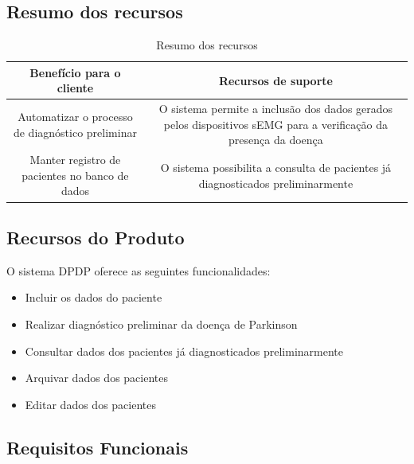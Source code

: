 \begin{anexosenv}
\subsection{Resumo dos recursos}

    \begin{table}[]
        \centering
        \caption{Resumo dos recursos}
        \begin{tabular}{@{}|c|c|@{}}
        \toprule
        \textbf{Benefício para o cliente}                & \textbf{Recursos de suporte}                                                                                    \\ \midrule
        Automatizar o processo de diagnóstico preliminar & O sistema permite a inclusão dos dados gerados pelos dispositivos sEMG para a verificação da presença da doença \\ \midrule
        Manter registro de pacientes no banco de dados   & O sistema possibilita a consulta de pacientes já diagnosticados preliminarmente                                 \\ \bottomrule
        \end{tabular}
        \label{table:Resumo dos recursos}
    \end{table}

\subsection{Recursos do Produto}

O sistema DPDP oferece as seguintes funcionalidades:

\begin{itemize}
    \item Incluir os dados do paciente
    \item Realizar diagnóstico preliminar da doença de Parkinson
    \item Consultar dados dos pacientes já diagnosticados preliminarmente
    \item Arquivar dados dos pacientes
    \item Editar dados dos pacientes
\end{itemize}

\subsection{Requisitos Funcionais}


\end{anexosenv}
